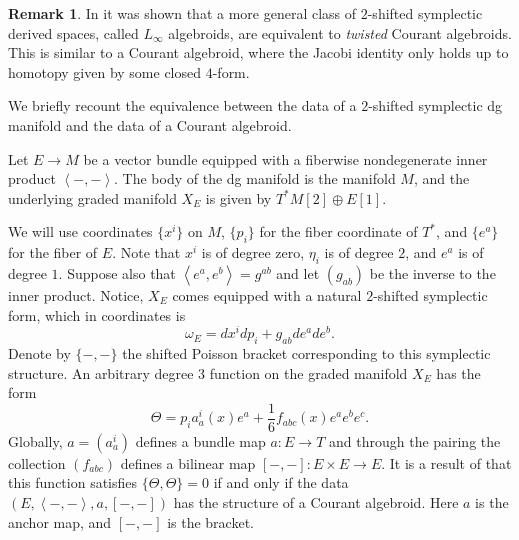 \documentclass{article}
\def\xto{\xrightarrow}
\theoremstyle{definition}
\newtheorem{remark}[theorem]{Remark}
\theoremstyle{remark}
\def\brian{\textcolor{blue}{BM: }\textcolor{blue}}
\begin{document}
\begin{remark}
In \cite{PymSafronov} it was shown that a more general class of $2$-shifted symplectic derived spaces, called $L_\infty$ algebroids, are equivalent to {\em twisted} Courant algebroids. 
This is similar to a Courant algebroid, where the Jacobi identity only holds up to homotopy given by some closed $4$-form. 
\end{remark}

We briefly recount the equivalence between the data of a $2$-shifted symplectic dg manifold and the data of a Courant algebroid.

\def\Sym{{\rm Sym}}

Let $E \to M$ be a vector bundle equipped with a fiberwise nondegenerate inner product $\left<-,-\right>$.
The body of the dg manifold is the manifold $M$, and the underlying graded manifold $X_E$ is given by $T^*M [2] \oplus E[1]$. 

We will use coordinates $\{x^i\}$ on $M$, $\{p_i\}$ for the fiber coordinate of $T^*$, and $\{e^a\}$ for the fiber of $E$. 
Note that $x^i$ is of degree zero, $\eta_i$ is of degree $2$, and $e^a$ is of degree $1$.
Suppose also that $\left<e^a, e^b\right> = g^{ab}$ and let $(g_{ab})$ be the inverse to the inner product. 
Notice, $X_E$ comes equipped with a natural $2$-shifted symplectic form, which in coordinates is 
\[
\omega_E = d x^i d p_i + g_{ab} d e^a d e^b .
\]
Denote by $\{-,-\}$ the shifted Poisson bracket corresponding to this symplectic structure. 
An arbitrary degree $3$ function on the graded manifold $X_E$ has the form
\[
\Theta = p_i a_a^i (x) e^a + \frac{1}{6} f_{abc} (x) e^a e^b e^c .
\]
Globally, $a = (a_a^i)$ defines a bundle map $a : E \to T$ and through the pairing the collection $(f_{abc})$ defines a bilinear map $[-,-] : E \times E \to E$. 
It is a result of \cite{Roytenberg:2002nu} that this function satisfies $\{\Theta, \Theta\} = 0$ if and only if the data $(E, \left<-,-\right>, a, [-,-])$ has the structure of a Courant algebroid. 
Here $a$ is the anchor map, and $[-,-]$ is the bracket. 

%
\end{document}
